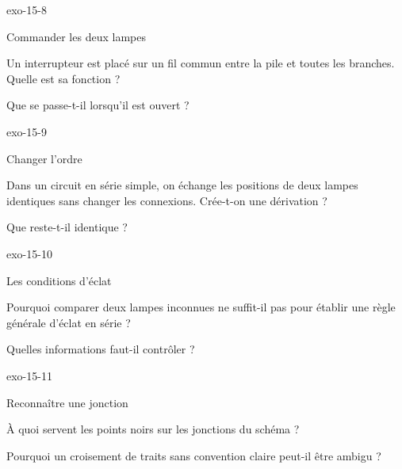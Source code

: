 \documentclass[12pt,twoside,openany]{book}
\begin{document}
\begin{blocLivre}{exo-15-8}
\begin{exercice}[2]{Commander les deux lampes}
\begin{questions}
\item Un interrupteur est placé sur un fil commun entre la pile et toutes les branches. Quelle est sa fonction ?
\item Que se passe-t-il lorsqu’il est ouvert ?
\end{questions}
\end{exercice}\end{blocLivre}
\begin{blocLivre}{exo-15-9}
\begin{exercice}[2]{Changer l’ordre}
\begin{questions}
\item Dans un circuit en série simple, on échange les positions de deux lampes identiques sans changer les connexions. Crée-t-on une dérivation ?
\item Que reste-t-il identique ?
\end{questions}
\end{exercice}\end{blocLivre}
\begin{blocLivre}{exo-15-10}
\begin{exercice}[2]{Les conditions d’éclat}
\begin{questions}
\item Pourquoi comparer deux lampes inconnues ne suffit-il pas pour établir une règle générale d’éclat en série ?
\item Quelles informations faut-il contrôler ?
\end{questions}
\end{exercice}\end{blocLivre}
\begin{blocLivre}{exo-15-11}
\begin{exercice}[2]{Reconnaître une jonction}
\begin{questions}
\item À quoi servent les points noirs sur les jonctions du schéma ?
\item Pourquoi un croisement de traits sans convention claire peut-il être ambigu ?
\end{questions}
\end{exercice}\end{blocLivre}
\end{document}
